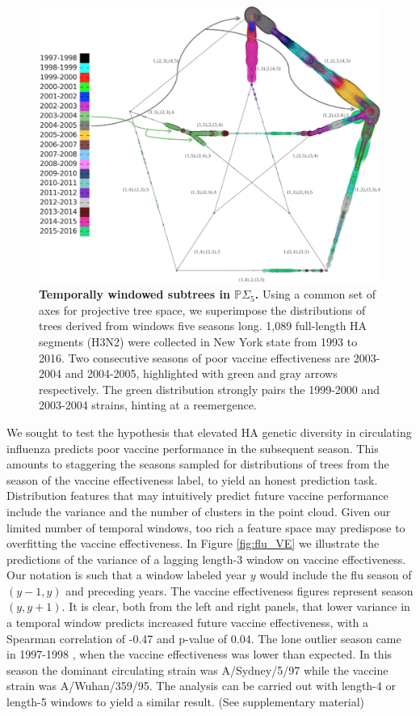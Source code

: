 \documentclass[a4paper,11pt]{article}
\begin{document}
\begin{figure}
    \centering
    \includegraphics[width=6in]{../figures/influenza_quint.png}
    \caption{{\bf Temporally windowed subtrees in $\mathbb{P}\Sigma_5$.} Using a common set of axes for projective tree space, we superimpose the distributions of trees derived from windows five seasons long. 1,089 full-length HA segments (H3N2) were collected in New York state from 1993 to 2016. Two consecutive seasons of poor vaccine effectiveness are 2003-2004 and 2004-2005, highlighted with green and gray arrows respectively. The green distribution strongly pairs the 1999-2000 and 2003-2004 strains, hinting at a reemergence.}
    \label{fig:flu_quint}
\end{figure}

We sought to test the hypothesis that elevated HA genetic diversity in circulating influenza predicts poor vaccine performance in the subsequent season.
This amounts to staggering the seasons sampled for distributions of trees from the season of the vaccine effectiveness label, to yield an honest prediction task.
Distribution features that may intuitively predict future vaccine performance include the variance and the number of clusters in the point cloud.
Given our limited number of temporal windows, too rich a feature space may predispose to overfitting the vaccine effectiveness.
In Figure \ref{fig:flu_VE} we illustrate the predictions of the variance of a lagging length-3 window on vaccine effectiveness.
Our notation is such that a window labeled year $y$ would include the flu season of $(y-1, y)$ and preceding years.
The vaccine effectiveness figures represent season $(y, y+1).$
It is clear, both from the left and right panels, that lower variance in a temporal window predicts increased future vaccine effectiveness, with a Spearman correlation of -0.47 and p-value of 0.04. The lone outlier season came in 1997-1998 \cite{gupta2006quantifying}, when the vaccine effectiveness was lower than expected. In this season the dominant circulating strain was A/Sydney/5/97 while the vaccine strain was A/Wuhan/359/95. 
The analysis can be carried out with length-4 or length-5 windows to yield a similar result. (See supplementary material)
\end{document}
